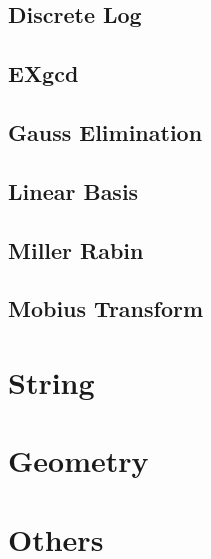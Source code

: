 \documentclass[a4paper,10pt,twocolumn,oneside]{article}
\begin{document}
\subsection{Discrete Log}


\subsection{EXgcd}


\subsection{Gauss Elimination}


\subsection{Linear Basis}


\subsection{Miller Rabin}


\subsection{Mobius Transform}


\section{String}

\section{Geometry}

\section{Others}
\end{document}
